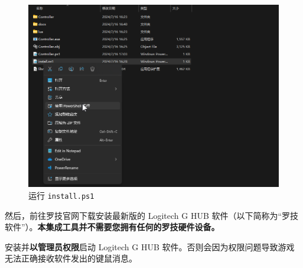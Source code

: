 \begin{figure}[H]
    \Centering
    \includegraphics[width=\textwidth]{docs/assets/install.png}
    \caption{运行 \lstinline{install.ps1}}
\end{figure}

然后，前往罗技官网下载安装最新版的 Logitech G HUB 软件（以下简称为“罗技软件”）。\textbf{\color{red}本集成工具并不需要您拥有任何的罗技硬件设备。}

安装并\textbf{\color{red}以管理员权限}启动 Logitech G HUB 软件。否则会因为权限问题导致游戏无法正确接收软件发出的键鼠消息。

